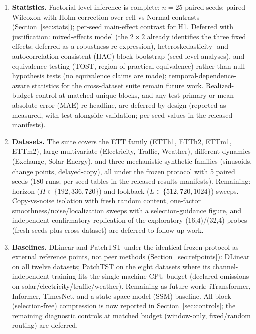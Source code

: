 \begin{enumerate}
  \item \textbf{Statistics.} Factorial-level inference is complete:
        $n{=}25$ paired seeds; paired Wilcoxon with
        Holm correction over cell-vs-Normal contrasts
        (Section~\ref{sec:stats}); per-seed main-effect contrast for H1.
        Deferred with justification: mixed-effects model (the $2\times2$ already
        identifies the three fixed effects; deferred as a robustness re-expression),
        heteroskedasticity- and autocorrelation-consistent (HAC) block
        bootstrap (seed-level analyses), and equivalence testing (TOST, region
        of practical equivalence) rather than null-hypothesis tests (no
        equivalence claims are made); temporal-dependence-aware statistics for the
        cross-dataset suite remain future work. Realized-budget control at matched unique blocks, and any test-primary or mean-absolute-error (MAE) re-headline, are deferred by design (reported as measured, with test alongside validation; per-seed values in the released manifests).
  \item \textbf{Datasets.} The suite covers
        the ETT family (ETTh1, ETTh2, ETTm1, ETTm2), large multivariate
        (Electricity, Traffic, Weather), different dynamics (Exchange,
        Solar-Energy), and three mechanistic synthetic families (sinusoids,
        change points, delayed-copy), all under the frozen protocol with 5
        paired seeds (180 runs; per-seed tables in the released results
        manifests). Remaining: horizon ($H \in \{192, 336, 720\}$)
        and lookback ($L \in \{512, 720, 1024\}$) sweeps. Copy-vs-noise isolation with fresh random content, one-factor smoothness/noise/localization sweeps with a selection-guidance figure, and independent confirmatory replication of the exploratory (16,4)/(32,4) probes (fresh seeds plus cross-dataset) are deferred to follow-up work.
  \item \textbf{Baselines.} DLinear \citep{zeng2023dlinear} and PatchTST \citep{nie2023patchtst}
        under the identical frozen protocol as external reference points,
        not peer methods (Section~\ref{sec:refpoints}): DLinear on all
        twelve datasets; PatchTST on the eight datasets where its
        channel-independent training fits the single-machine CPU budget
        (declared omissions on solar/electricity/traffic/weather).
        Remaining as future work: iTransformer, Informer, TimesNet, and a
        state-space-model (SSM) baseline. All-block (selection-free) compression is now reported in Section~\ref{sec:controls}; the remaining diagnostic controls at matched budget (window-only, fixed/random routing) are deferred.

\end{enumerate}
